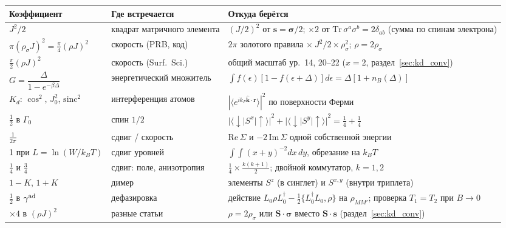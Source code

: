 \begin{center}\small
\begin{tabular}{p{3.4cm}p{3.4cm}p{7.2cm}}
\toprule
Коэффициент & Где встречается & Откуда берётся \\
\midrule
$J^2/2$ & квадрат матричного элемента & $(J/2)^2$ от $\mathbf s=\boldsymbol\sigma/2$; $\times2$ от
$\mathrm{Tr}\,\sigma^a\sigma^b=2\delta_{ab}$ (сумма по спинам электрона) \\
$\pi(\rho_\sigma J)^2=\tfrac\pi4(\rho J)^2$ & скорость (PRB, код) & $2\pi$ золотого правила
$\times\ J^2/2\times\rho_\sigma^2$; $\rho=2\rho_\sigma$ \\
$\tfrac\pi2(\rho J)^2$ & скорость (Surf.\ Sci.) & общий масштаб ур.~14, 20--22 ($x=2$, раздел~\ref{sec:kd_conv}) \\
$G=\dfrac{\Delta}{1-e^{-\beta\Delta}}$ & энергетический множитель &
$\int f(\epsilon)[1-f(\epsilon+\Delta)]d\epsilon=\Delta[1+n_B(\Delta)]$ \\
$K_d$: $\cos^2$, $J_0^2$, $\mathrm{sinc}^2$ & интерференция атомов & $|\langle e^{ik_F\hat{\mathbf k}\cdot\mathbf r}\rangle|^2$ по
поверхности Ферми \\
$\tfrac12$ в $\Gamma_0$ & спин $1/2$ & $|\langle\downarrow|S^x|\uparrow\rangle|^2+|\langle\downarrow|S^y|\uparrow\rangle|^2=\tfrac14+\tfrac14$ \\
$\tfrac1{2\pi}$ & сдвиг / скорость & $\mathrm{Re}\,\Sigma$ и $-2\,\mathrm{Im}\,\Sigma$ одной собственной энергии \\
1 при $L=\ln(W/k_BT)$ & сдвиг уровней & $\int\!\!\int(x+y)^{-2}dx\,dy$, обрезание на $k_BT$ \\
$\tfrac14$ и $\tfrac34$ & сдвиг: поле, анизотропия & $\tfrac14\times\tfrac{k(k+1)}2$; двойной
коммутатор, $k=1,2$ \\
$1-K$, $1+K$ & димер & элементы $S^z$ (в синглет) и $S^{x,y}$ (внутри триплета) \\
$\tfrac12$ в $\gamma^{\rm ad}$ & дефазировка & действие $L_0\rho L_0^\dagger-\tfrac12\{L_0^\dagger L_0,\rho\}$ на
$\rho_{MM'}$; проверка $T_1=T_2$ при $B\to0$ \\
$\times4$ в $(\rho J)^2$ & разные статьи & $\rho=2\rho_\sigma$ или $\mathbf S\cdot\boldsymbol\sigma$ вместо $\mathbf S\cdot\mathbf s$ (раздел~\ref{sec:kd_conv}) \\
\bottomrule
\end{tabular}
\end{center}

